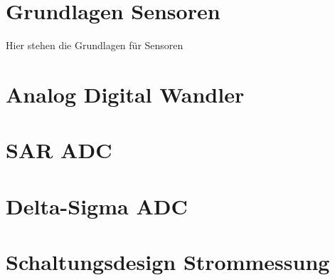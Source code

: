 \section{Grundlagen Sensoren}
Hier stehen die Grundlagen für Sensoren

\section{Analog Digital Wandler}

\section{SAR ADC}

\section{Delta-Sigma ADC}

\section{Schaltungsdesign Strommessung}